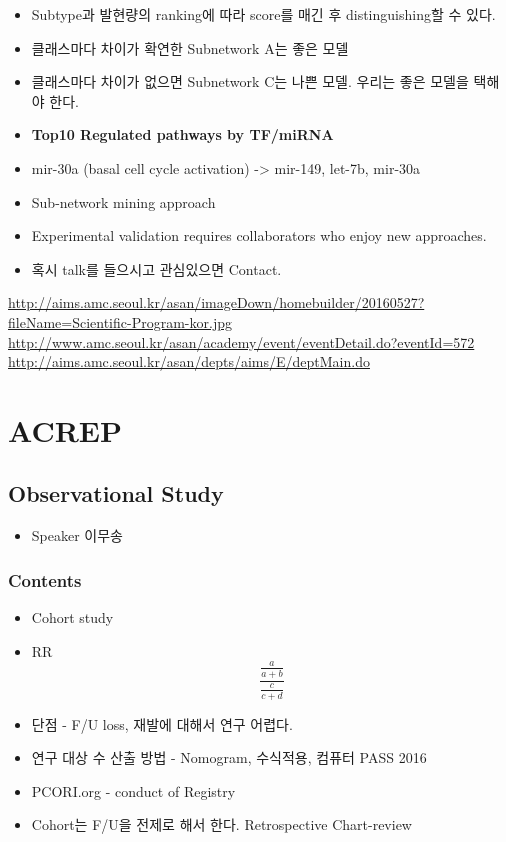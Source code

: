 \documentclass[]{book}
\providecommand{\tightlist}{%
  \setlength{\itemsep}{0pt}\setlength{\parskip}{0pt}}
\begin{document}
\begin{itemize}
\item
  Subtype과 발현량의 ranking에 따라 score를 매긴 후 distinguishing할 수
  있다.
\item
  클래스마다 차이가 확연한 Subnetwork A는 좋은 모델
\item
  클래스마다 차이가 없으면 Subnetwork C는 나쁜 모델. 우리는 좋은 모델을
  택해야 한다.
\item
  \textbf{Top10 Regulated pathways by TF/miRNA}
\item
  mir-30a (basal cell cycle activation) -\textgreater{} mir-149, let-7b,
  mir-30a
\item
  Sub-network mining approach
\item
  Experimental validation requires collaborators who enjoy new
  approaches.
\item
  혹시 talk를 들으시고 관심있으면 Contact.
\end{itemize}

\url{http://aims.amc.seoul.kr/asan/imageDown/homebuilder/20160527?fileName=Scientific-Program-kor.jpg}
\url{http://www.amc.seoul.kr/asan/academy/event/eventDetail.do?eventId=572}
\url{http://aims.amc.seoul.kr/asan/depts/aims/E/deptMain.do}

\chapter{ACREP}\label{acrep}

\section{Observational Study}\label{observational-study}

\begin{itemize}
\tightlist
\item
  Speaker 이무송
\end{itemize}

\subsection{Contents}\label{contents}

\begin{itemize}
\tightlist
\item
  Cohort study
\item
  RR \[ \frac{\frac{a}{a+b}}{\frac{c}{c+d}} \]
\item
  단점 - F/U loss, 재발에 대해서 연구 어렵다.
\item
  연구 대상 수 산출 방법 - Nomogram, 수식적용, 컴퓨터 PASS 2016
\item
  PCORI.org - conduct of Registry
\item
  Cohort는 F/U을 전제로 해서 한다. Retrospective Chart-review
\end{itemize}
\end{document}
